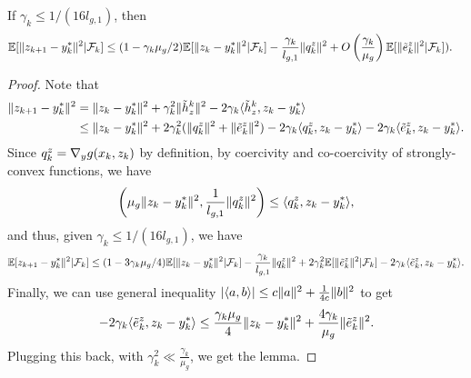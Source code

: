 \begin{lemma}
    \label{lemma:z_descent_2}
    If $\gamma_k \le 1 / (16 l_{g,1})$, then
    \begin{align*}
        \mathbb{E}[\|z_{k+1} - y_{k}^*\|^2 | \mathcal{F}_k] &\le (1 - \gamma_k \mu_g / 2) \mathbb{E}[\|z_{k} - y_k^*\|^2 | \mathcal{F}_k] - \frac{\gamma_k}{l_{g,1}} \|q_k^z\|^2 + O\left(\frac{\gamma_k}{\mu_g} \right) \mathbb{E}[\|\tilde{e}_k^z\|^2 | \mathcal{F}_k]). 
    \end{align*}
\end{lemma}
\begin{proof}
    Note that
    \begin{align*}
        \|z_{k+1} - y_k^*\|^2 &= \|z_k - y_k^*\|^2 + \gamma_k^2 \|\tilde{h}_z^k\|^2 - 2\gamma_k \langle \tilde{h}_z^k, z_k - y_k^* \rangle \\
        &\le \|z_k - y_k^*\|^2 + 2\gamma_k^2 (\|q_k^z\|^2 + \|\tilde{e}_k^z\|^2) - 2\gamma_k \langle q_k^z, z_k - y_k^* \rangle - 2\gamma_k \langle \tilde{e}_k^z, z_k - y_k^* \rangle.
    \end{align*}
    Since $q_k^z = \nabla_y g(x_k, z_k)$ by definition, by coercivity and co-coercivity of strongly-convex functions, we have
    \begin{align*}
        \left( \mu_g \|z_k - y_k^*\|^2, \frac{1}{l_{g,1}}\|q_k^z\|^2 \right) \le \langle q_k^z, z_k - y_k^* \rangle,  
    \end{align*}
    and thus, given $\gamma_k \le 1/(16l_{g,1})$, we have
    \begin{align*}
        \mathbb{E}[z_{k+1} - y_k^*\|^2 | \mathcal{F}_k] \le (1 - 3 \gamma_k \mu_g/4) \mathbb{E}[\|z_k - y_k^*\|^2 | \mathcal{F}_k] - \frac{\gamma_k}{l_{g,1}} \|q_k^z\|^2 + 2\gamma_k^2 \mathbb{E}[\|\tilde{e}_k^z\|^2 | \mathcal{F}_k] - 2\gamma_k \langle \tilde{e}_k^z, z_k - y_k^* \rangle.
    \end{align*}
    Finally, we can use general inequality $|\langle a, b \rangle| \le c\|a\|^2 + \frac{1}{4c} \|b\|^2$ to get
    \begin{align*}
        -2\gamma_k \langle \tilde{e}_k^z, z_k - y_k^* \rangle \le \frac{\gamma_k \mu_g}{4} \|z_k - y_k^*\|^2 + \frac{4\gamma_k}{\mu_g} \|\tilde{e}_k^z\|^2. 
    \end{align*}
    Plugging this back, with $\gamma_k^2 \ll \frac{\gamma_k}{\mu_g}$, we get the lemma. 
\end{proof}







